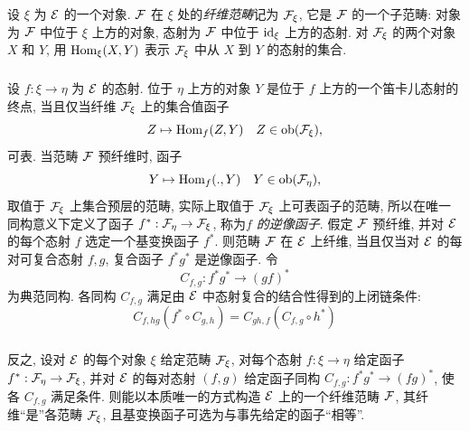 \setcounter{subsection}{1}
\subsubsection{}

设 $\xi$ 为 ${\mathcal E}$ 的一个对象.
${\mathcal F}$ 在 $\xi$ 处的\emph{纤维范畴}记为 ${\mathcal F}_{\xi}$,
它是 ${\mathcal F}$ 的一个子范畴:
对象为 ${\mathcal F}$ 中位于 $\xi$ 上方的对象,
态射为 ${\mathcal F}$ 中位于 $\operatorname{id}_{\xi}$ 上方的态射.
对 ${\mathcal F}_{\xi}$ 的两个对象 $X$ 和 $Y$,
用 $\operatorname{Hom}_{\xi}(X,Y)$ 表示 ${\mathcal F}_{\xi}$ 中从 $X$ 到 $Y$ 的态射的集合.

\subsubsection{}

设 $f:\xi\to\eta$ 为 ${\mathcal E}$ 的态射.
位于 $\eta$ 上方的对象 $Y$ 是位于 $f$ 上方的一个笛卡儿态射的终点,
当且仅当纤维 ${\mathcal F}_{\xi}$ 上的集合值函子
$$
Z \mapsto \operatorname{Hom}_f(Z, Y)\quad Z \in \operatorname{ob} ({\mathcal F}_{\xi}){},
$$
可表. 当范畴 ${\mathcal F}$ 预纤维时, 函子
$$
Y \mapsto \operatorname{Hom}_f(., Y)\quad Y \in \operatorname{ob} ({\mathcal F}_{\eta}){},
$$
取值于 ${\mathcal F}_{\xi}$ 上集合预层的范畴,
实际上取值于 ${\mathcal F}_{\xi}$ 上可表函子的范畴,
所以在唯一同构意义下定义了函子 $f^{\ast}:\Ff_{\eta}\to\Ff_{\xi}$,
称为\emph{$f$ 的逆像\pageoriginale 函子}.
假定 ${\mathcal F}$ 预纤维, 并对 ${\mathcal E}$ 的每个态射 $f$ 选定一个基变换函子 $f^{\ast}$.
则范畴 ${\mathcal F}$ 在 ${\mathcal E}$ 上纤维,
当且仅当对 ${\mathcal E}$ 的每对可复合态射 $f,g$,
复合函子 $f^{\ast}g^{\ast}$ 是逆像函子.
令
\begin{equation*}
C_{f, g} : f^{\ast} g^{\ast} \to (gf)^{\ast}\tag{6.1.2.1}
\end{equation*}
为典范同构.
各同构 $C_{f,g}$ 满足由 ${\mathcal E}$ 中态射复合的结合性得到的上闭链条件:
\begin{equation*}
C_{f, hg}(f^{\ast} \circ C_{g, h}) = C_{gh, f}(C_{f, g} \circ h^{\ast})\tag{6.1.2.2}
\end{equation*}

\subsubsection{}

反之, 设对 ${\mathcal E}$ 的每个对象 $\xi$ 给定范畴 ${\mathcal F}_{\xi}$,
对每个态射 $f:\xi\to\eta$ 给定函子 $f^{\ast}:\Ff_\eta\to\Ff_{\xi}$,
并对 ${\mathcal E}$ 的每对态射 $(f,g)$ 给定函子同构
$C_{f,g}:f^{\ast}g^{\ast}\to(fg)^{\ast}$,
使各 $C_{f,g}$ 满足条件.
则能以本质唯一的方式构造 ${\mathcal E}$ 上的一个纤维范畴 ${\mathcal F}$,
其纤维“是”各范畴 ${\mathcal F}_{\xi}$,
且基变换函子可选为与事先给定的函子“相等”\cite{sga4.exp.VI.bib.5}.

